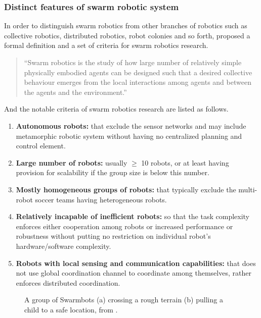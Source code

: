 \subsubsection*{Distinct features of swarm robotic system}
In order to distinguish swarm robotics from other branches of robotics such as collective robotics, distributed robotics, robot colonies and so forth,  proposed a formal definition and a set of criteria for swarm robotics research. 
\begin{quote}
\ssp
``Swarm robotics is the study of how large number of relatively simple physically embodied agents can be designed such that a desired collective behaviour emerges from the local interactions among agents and between the agents and the environment.'' 
\end{quote}
\sdp
And the notable criteria of swarm robotics research are listed as follows.
\begin{enumerate}
\item \textbf{Autonomous robots: }
that exclude the sensor networks and may include metamorphic robotic system without having no centralized planning and control element.
\item \textbf{Large number of robots: }
usually $\geq$ 10 robots, or at least having provision for scalability if the group size is below this number.
\item \textbf{Mostly homogeneous groups of robots: }
that typically exclude the multi-robot soccer teams having heterogeneous robots.
\item\textbf{ Relatively incapable of inefficient robots: }
so that the task complexity enforces either cooperation among robots or increased performance or robustness without putting no restriction on individual robot's hardware/software complexity.
\item \textbf{Robots with local sensing and communication capabilities: } 
that does not use global coordination channel to coordinate among themselves, rather enforces distributed coordination.
\end{enumerate}
\begin{figure}
\centering
{}
\hspace{0.5cm}
\caption{A group of Swarmbots (a) crossing a rough terrain (b) pulling a child to a safe location, from \protect{}.}
\label{fig:swarmbots} %
\end{figure}
